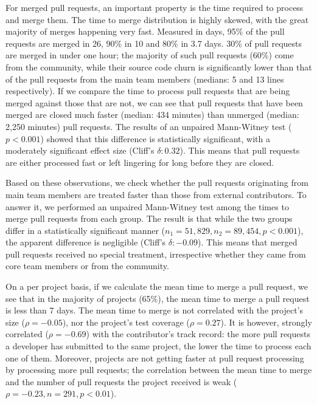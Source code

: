 \documentclass{sig-alternate}
\begin{document}
For merged pull requests, an important property is the time required to process
and merge them. The time to merge distribution is highly skewed, with the great
majority of merges happening very fast. Measured in days, 95\% of the pull
requests are merged in 26, 90\% in 10 and 80\% in 3.7 days. 30\% of pull
requests are merged in under one hour; the majority of such pull requests (60\%)
come from the community, while their source code churn is significantly lower
than that of the pull requests from the main team members (medians: 5 and 13
lines respectively). If we compare the time to process pull requests that are being
merged against those that are not, we can see that pull requests that have been
merged are closed much faster (median: 434 minutes) than unmerged (median: 2,250
minutes) pull requests.  The results of an unpaired Mann-Witney test ($p <
0.001$) showed that this difference is statistically significant, with a
moderately significant effect size (Cliff's $\delta: 0.32$). This means that
pull requests are either processed fast or left lingering for long before they
are closed.

Based on these observations, we check whether the pull
requests originating from main team members are treated faster than those from
external contributors. To answer it, we performed an unpaired Mann-Witney test
among the times to merge pull requests from each group. The result is that while
the two groups differ in a statistically significant manner ($n_1 = 51,829, n_2
= 89,454, p < 0.001$), the apparent difference is negligible (Cliff's $\delta:
-0.09$). This means that merged pull requests received no special treatment,
irrespective whether they came from core team members or from the community.

On a per project basis, if we calculate the mean time to merge a pull request,
we see that in the majority of projects (65\%), the mean time to merge a pull
request is less than 7 days. The mean time to merge is not correlated with the
project's size ($\rho = -0.05$), nor the project's test coverage ($\rho =
0.27$). It is however, strongly correlated ($\rho = -0.69$) with the contributor's
track record: the more pull requests a
developer has submitted to the same project, the lower the time to process each
one of them.
Moreover, projects are not getting faster at pull request processing by
processing more pull requests; the correlation between the mean time to merge
and the number of pull requests the project received is weak ($\rho = -0.23, n = 291, p < 0.01$).
\end{document}
